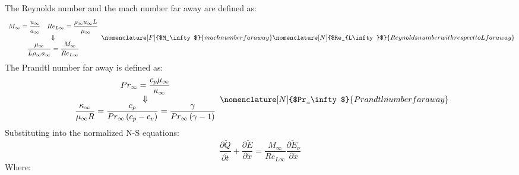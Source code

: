 \documentclass[11pt, a4paper]{article}
\newcommand{\parder}[2]{\frac{\partial {#1}}{\partial {#2}}}
\begin{document}
The Reynolds number and the mach number far away are defined as:
\begin{equation}
    \begin{array}{c}
        \begin{matrix}
            \displaystyle M_\infty=\frac{u_\infty}{a_\infty} & \displaystyle Re_{L\infty}=\frac{\rho_\infty u_\infty L}{\mu_\infty}
        \end{matrix} \\
        \Downarrow \\
        \displaystyle \frac{\mu_\infty}{L\rho_\infty a_\infty}=\frac{M_\infty}{Re_{L\infty}}
    \end{array}
    \nomenclature[F]{$M_\infty$}{mach number far away}
    \nomenclature[N]{$Re_{L\infty}$}{Reynolds number with respect to L far away}
\end{equation}
The Prandtl number far away is defined as:
\begin{equation}
    \begin{array}{c}
        \displaystyle Pr_\infty=\frac{c_p\mu_\infty}{\kappa_\infty} \\
        \Downarrow \\
        \displaystyle\frac{\kappa_\infty}{\mu_\infty R}=\frac{c_p}{Pr_\infty \left(c_p-c_v\right)}=\frac{\gamma}{Pr_\infty\left(\gamma-1\right)}
    \end{array}
    \nomenclature[N]{$Pr_\infty$}{Prandtl number far away}
\end{equation}
Substituting into the normalized N-S equations:
\begin{equation}
    \parder{\tilde{Q}}{\tilde{t}}+\parder{\tilde{E}}{\tilde{x}}=\frac{M_\infty}{Re_{L\infty}}\parder{\tilde{E}_\nu}{\tilde{x}}
\end{equation}
Where:
\end{document}
